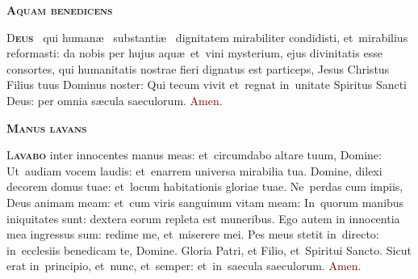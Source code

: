\documentclass[third]{../altarcard}
\begin{document}
\begin{center}

	\begin{minipage}{0.7\linewidth}

		\vspace*{2.7cm}

		\begin{center}
			\scshape\bfseries\Huge
			Aquam benedicens
		\end{center}


		\huge

		\lettrine[lines=3]{\color{Maroon}D}{\bfseries\color{Maroon}eus}
		\cross~qui human\ae~ substanti\ae~ dignitatem mirabiliter condidisti,
		et~mirabilius reformasti: da nobis per hujus aqu\ae~et~vini mysterium,
		ejus divinitatis esse consortes, qui humanitatis nostrae fieri dignatus
		est particeps, Jesus Christus Filius tuus Dominus noster: Qui tecum
		vivit et~regnat in~unitate Spiritus Sancti Deus: per omnia s\ae cula
		saeculorum. \textcolor{Maroon}{Amen.}

		\vspace*{0.1cm}

		\centerline{
			\scshape\bfseries\Huge
			Manus lavans}

		\vspace*{0.1cm}

		\lettrine[lines=3]{\color{Maroon}L}{\bfseries\color{Maroon}avabo} inter
		innocentes manus meas: et~circumdabo altare tuum, Domine: Ut~audiam
		vocem laudis: et~enarrem universa mirabilia tua. Domine, dilexi decorem
		domus tuae: et~locum habitationis gloriae tuae. Ne~perdas cum impiis,
		Deus animam meam: et~cum viris sanguinum vitam meam: In~quorum manibus
		iniquitates sunt: dextera eorum repleta est muneribus. Ego autem in
		innocentia mea ingressus sum: redime me, et~miserere mei. Pes meus
		stetit in~directo: in~ecclesiis benedicam te, Domine. Gloria Patri, et
		Filio, et~Spiritui Sancto. Sicut erat in~principio, et~nunc, et~semper:
		et~in~saecula saeculorum. \textcolor{Maroon}{Amen.}
	\end{minipage}
\end{center}

\vspace*{1cm}
\end{document}
